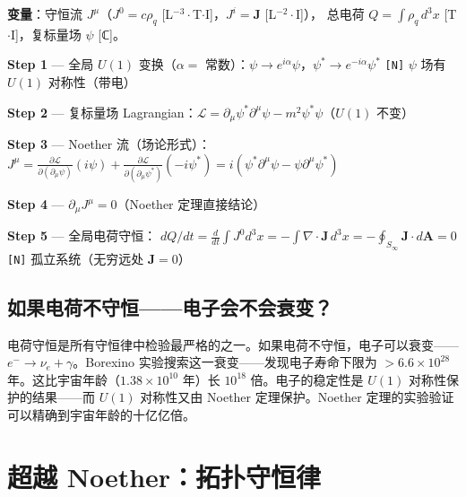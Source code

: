 \noindent\textbf{变量}：守恒流 $J^\mu$（$J^0 = c\rho_q$ [L$^{-3}\cdot$T$\cdot$I]，$J^i = \mathbf{J}$ [L$^{-2}\cdot$I]），
总电荷 $Q = \int\rho_q\,d^3x$ [T$\cdot$I]，复标量场 $\psi$ [ℂ]。

\begin{derivationbox}
  \textbf{Step 1} — 全局 $U(1)$ 变换（$\alpha =$ 常数）：$\psi \to e^{i\alpha}\psi$，$\psi^* \to e^{-i\alpha}\psi^*$
  \hfill\texttt{[N]} $\psi$ 场有 $U(1)$ 对称性（带电）

  \textbf{Step 2} — 复标量场 Lagrangian：$\mathcal{L} = \partial_\mu\psi^*\partial^\mu\psi - m^2\psi^*\psi$（$U(1)$ 不变）

  \textbf{Step 3} — Noether 流（场论形式）：
  $J^\mu = \frac{\partial\mathcal{L}}{\partial(\partial_\mu\psi)}(i\psi) + \frac{\partial\mathcal{L}}{\partial(\partial_\mu\psi^*)}(-i\psi^*) = i(\psi^*\partial^\mu\psi - \psi\partial^\mu\psi^*)$

  \textbf{Step 4} — $\partial_\mu J^\mu = 0$（Noether 定理直接结论）

  \textbf{Step 5} — 全局电荷守恒：
  $dQ/dt = \frac{d}{dt}\int J^0 d^3x = -\int\nabla\cdot\mathbf{J}\,d^3x = -\oint_{S_\infty}\mathbf{J}\cdot d\mathbf{A} = 0$
  \hfill\texttt{[N]} 孤立系统（无穷远处 $\mathbf{J}=0$）
\end{derivationbox}


\subsection{如果电荷不守恒——电子会不会衰变？}

电荷守恒是所有守恒律中检验最严格的之一。如果电荷不守恒，电子可以衰变——$e^- \to \nu_e + \gamma$。Borexino 实验搜索这一衰变——发现电子寿命下限为 $> 6.6 \times 10^{28}$ 年。这比宇宙年龄（$1.38 \times 10^{10}$ 年）长 $10^{18}$ 倍。电子的稳定性是 $U(1)$ 对称性保护的结果——而 $U(1)$ 对称性又由 Noether 定理保护。Noether 定理的实验验证可以精确到宇宙年龄的十亿亿倍。

\section{超越 Noether：拓扑守恒律}

